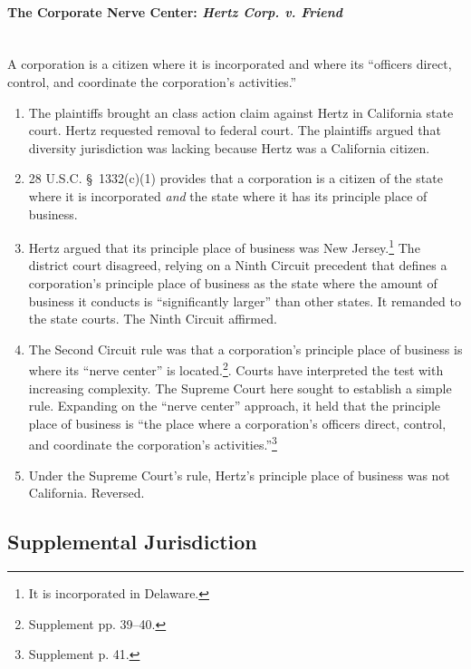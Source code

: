 \paragraph{The Corporate Nerve Center: \emph{Hertz Corp. v. Friend}\\\\}

A corporation is a citizen where it is incorporated and where its ``officers 
direct, control, and coordinate the corporation's activities.''

\begin{enumerate}
    \item The plaintiffs brought an class action claim against Hertz in 
    California state court. Hertz requested removal to federal court. The 
    plaintiffs argued that diversity jurisdiction was lacking because Hertz 
    was a California citizen.
    \item 28 U.S.C. \S\ 1332(c)(1) provides that a corporation is a citizen of 
    the state where it is incorporated \emph{and} the state where it has its 
    principle place of business.
    \item Hertz argued that its principle place of business was New 
    Jersey.\footnote{It is incorporated in Delaware.} The district court 
    disagreed, relying on a Ninth Circuit precedent that defines a 
    corporation's principle place of business as the state where the amount of 
    business it conducts is ``significantly larger'' than other states. It 
    remanded to the state courts. The Ninth Circuit affirmed.
    \item The Second Circuit rule was that a corporation's principle place of 
    business is where its ``nerve center'' is located.\footnote{Supplement pp.  
    39--40.}. Courts have interpreted the test with increasing complexity. The 
    Supreme Court here sought to establish a simple rule. Expanding on the 
    ``nerve center'' approach, it held that the principle place of business is 
    ``the place where a corporation's officers direct, control, and coordinate 
    the corporation's activities.''\footnote{Supplement p. 41.}
    \item Under the Supreme Court's rule, Hertz's principle place of business 
    was not California. Reversed.
\end{enumerate}

\subsection{Supplemental Jurisdiction}

